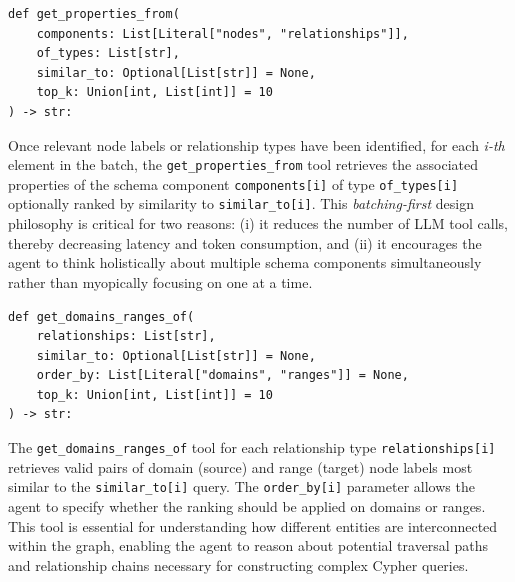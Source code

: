 %
\begin{verbatim}
def get_properties_from(
    components: List[Literal["nodes", "relationships"]],
    of_types: List[str],
    similar_to: Optional[List[str]] = None,
    top_k: Union[int, List[int]] = 10
) -> str:
\end{verbatim}
%
Once relevant node labels or relationship types have been identified, for each \textit{i-th} element in the batch, the \verb|get_properties_from| tool retrieves the associated properties of the schema component \verb|components[i]| of type \verb|of_types[i]| optionally ranked by similarity to \verb|similar_to[i]|. This \textit{batching-first} design philosophy is critical for two reasons: (i) it reduces the number of LLM tool calls, thereby decreasing latency and token consumption, and (ii) it encourages the agent to think holistically about multiple schema components simultaneously rather than myopically focusing on one at a time. %
%
%
\begin{verbatim}
def get_domains_ranges_of(
    relationships: List[str],
    similar_to: Optional[List[str]] = None,
    order_by: List[Literal["domains", "ranges"]] = None,
    top_k: Union[int, List[int]] = 10
) -> str:
\end{verbatim}
%
The \verb|get_domains_ranges_of| tool for each relationship type \verb|relationships[i]| retrieves valid pairs of domain (source) and range (target) node labels most similar to the \verb|similar_to[i]| query. The \verb|order_by[i]| parameter allows the agent to specify whether the ranking should be applied on domains or ranges. This tool is essential for understanding how different entities are interconnected within the graph, enabling the agent to reason about potential traversal paths and relationship chains necessary for constructing complex Cypher queries.%
